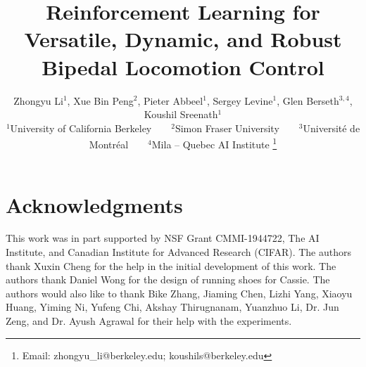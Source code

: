 \documentclass[letterpaper, 10 pt, journal, twoside]{ieeetran}
\begin{document}
\title{Reinforcement Learning for Versatile, Dynamic, and Robust Bipedal Locomotion Control}
\author{Zhongyu Li$^1$, Xue Bin Peng$^2$, Pieter Abbeel$^1$, Sergey Levine$^1$, Glen Berseth$^{3,4}$, Koushil Sreenath$^1$\\
\normalsize{$^1$University of California Berkeley~~~~$^2$Simon Fraser University~~~~$^3$Universit\'e de Montr\'eal~~~~$^4$Mila – Quebec AI Institute}
\thanks{Email: zhongyu\_li@berkeley.edu; koushils@berkeley.edu}
}

\maketitle
















\section*{Acknowledgments}
This work was in part supported by NSF Grant CMMI-1944722, The AI Institute, and Canadian Institute for Advanced Research (CIFAR).
The authors thank Xuxin Cheng for the help in the initial development of this work. The authors thank Daniel Wong for the design of running shoes for Cassie. The authors would also like to thank Bike Zhang, Jiaming Chen, Lizhi Yang, Xiaoyu Huang, Yiming Ni, Yufeng Chi, Akshay Thirugnanam, Yuanzhuo Li, Dr. Jun Zeng, and Dr. Ayush Agrawal for their help with the experiments. 

\balance


\pagebreak


\end{document}
